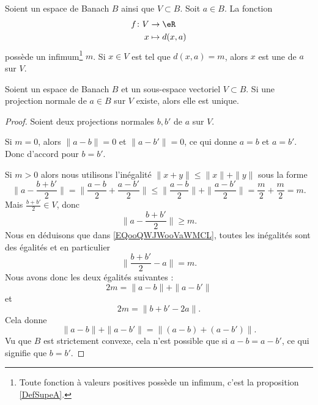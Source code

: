 \begin{definition}      \label{DEFooMYYLooJyACPL}
    Soient un espace de Banach \( B\) ainsi que \( V\subset B\). Soit \( a\in B\). La fonction
    \begin{equation}
        \begin{aligned}
            f\colon V & \to \eR        \\
            x         & \mapsto d(x,a)
        \end{aligned}
    \end{equation}
    possède un infimum\footnote{Toute fonction à valeurs positives possède un infimum, c'est la proposition \ref{DefSupeA}.} \( m\). Si \( x\in V\) est tel que \( d(x,a)=m\), alors \( x\) est une  de \( a\) sur \( V\).
\end{definition}

\begin{proposition}       \label{PROPooDKXVooUoYPgz}
    Soient un espace de Banach \( B\) et un sous-espace vectoriel \( V\subset B\). Si une projection normale de \( a\in B\) sur \( V\) existe, alors elle est unique.
\end{proposition}

\begin{proof}
    Soient deux projections normales \( b,b'\) de \( a\) sur \( V\).

    Si \( m=0\), alors \( \| a-b \|=0\) et \( \| a-b' \|=0\), ce qui donne \( a=b\) et \( a=b'\). Donc d'accord pour \( b=b'\).

    Si \( m>0\) alors nous utilisons l'inégalité \( \| x+y \|\leq \| x \|+\| y \|\) sous la forme
    \begin{equation}        \label{EQooQWJWooVaWMCL}
        \| a-\frac{ b+b' }{ 2 } \|=\| \frac{ a-b }{2}+\frac{ a-b' }{2} \|\leq \| \frac{ a-b }{2} \|+\| \frac{ a-b' }{2} \|=\frac{ m }{ 2 }+\frac{ m }{2}=m.
    \end{equation}
    Mais \( \frac{ b+b' }{2}\in V\), donc
    \begin{equation}
        \| a-\frac{ b+b' }{2} \|\geq m.
    \end{equation}
    Nous en déduisons que dans \eqref{EQooQWJWooVaWMCL}, toutes les inégalités sont des égalités et en particulier
    \begin{equation}
        \| \frac{ b+b' }{2}-a \|=m.
    \end{equation}
    Nous avons donc les deux égalités suivantes :
    \begin{equation}
        2m=\| a-b \|+\| a-b' \|
    \end{equation}
    et
    \begin{equation}
        2m=\| b+b'-2a \|.
    \end{equation}
    Cela donne
    \begin{equation}
        \| a-b \|+\| a-b' \|=\| (a-b)+(a-b') \|.
    \end{equation}
    Vu que \( B\) est strictement convexe, cela n'est possible que si \( a-b=a-b'\), ce qui signifie que \( b=b'\).
\end{proof}


